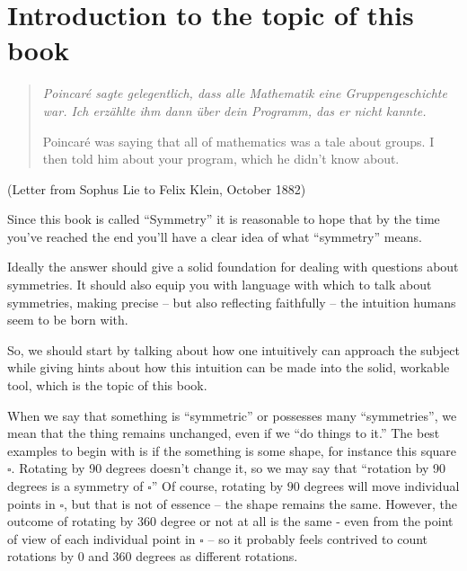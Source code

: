 \chapter{Introduction to the topic of this book}
\label{ch:intro}

\begin{quote}
  \itshape \foreignlanguage{ngerman}{Poincar\'e sagte gelegentlich,
  dass alle Mathematik eine Gruppengeschichte war.
  Ich erz\"ahlte ihm dann \"uber dein Programm,
  das er nicht kannte.}

  \smallskip

  \noindent Poincar\'e was saying
  that all of mathematics was a tale about groups.
  I then told him about your program,
  which he didn't know about.
\end{quote}
\hfill (Letter from Sophus Lie to Felix Klein, October 1882)

\bigskip



Since this book is called ``Symmetry'' it is reasonable to hope
that by the time you've reached the end you'll have a clear idea of
what ``symmetry'' means.

Ideally the answer should give a solid foundation for dealing with
questions about symmetries. It should also equip you with language
with which to talk about symmetries, making precise -- but also
reflecting faithfully -- the intuition humans seem to be born with.

So, we should start by talking about how one intuitively can approach the
subject while giving hints about how this intuition can be made into
the solid, workable tool, 
which is the topic  of this book.


When we say that something is ``symmetric'' or possesses many ``symmetries'',
we mean that the thing remains unchanged, even if we ``do things to it.''
The best examples to begin with is if the something is some shape, for
instance this square $\square$. Rotating by 90 degrees doesn’t change it, so we may say that ``rotation by 90 degrees is a symmetry of $\square$''
Of course, rotating by $90$ degrees will move individual points in $\square$, but that
is not of essence -- the shape remains the same.
However, the outcome of rotating by $360$ degree or not at all
is the same - even from the point of view of each individual point in $\square$ -- so it probably feels contrived to count rotations by $0$ and $360$ degrees as different rotations.

